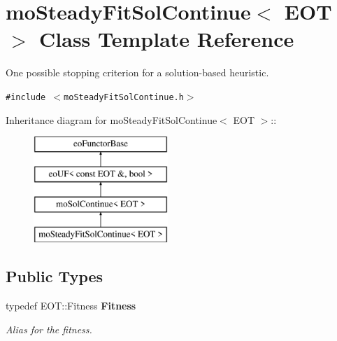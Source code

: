 \section{mo\-Steady\-Fit\-Sol\-Continue$<$ EOT $>$ Class Template Reference}
\label{classmo_steady_fit_sol_continue}
One possible stopping criterion for a solution-based heuristic.  


{\tt \#include $<$mo\-Steady\-Fit\-Sol\-Continue.h$>$}

Inheritance diagram for mo\-Steady\-Fit\-Sol\-Continue$<$ EOT $>$::\begin{figure}[H]
\begin{center}
\leavevmode
\includegraphics[height=4cm]{classmo_steady_fit_sol_continue}
\end{center}
\end{figure}
\subsection*{Public Types}
\begin{CompactItemize}
\item 
typedef EOT::Fitness {\bf Fitness}\label{classmo_steady_fit_sol_continue_w0}

\begin{CompactList}\small\item\em Alias for the fitness. \item\end{CompactList}\end{CompactItemize}
